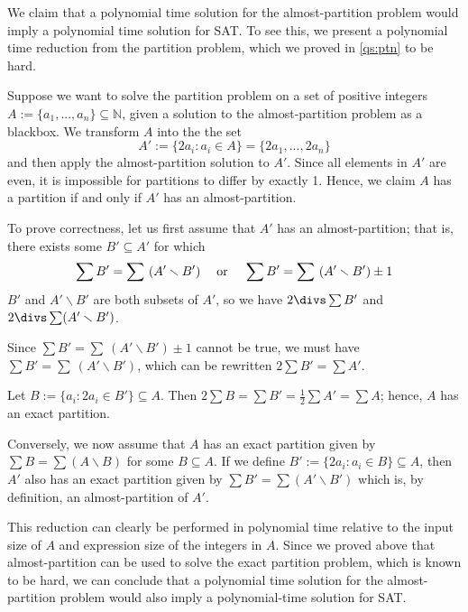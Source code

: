 \documentclass{article}
\begin{document}
\begin{solution}
We claim that a polynomial time solution for the almost-partition problem would imply a polynomial time solution for SAT. To see this, we present a polynomial time reduction from the partition problem, which we proved in \ref{qs:ptn} to be hard.

Suppose we want to solve the partition problem on a set of positive integers \( A := \{ a_1, ..., a_n\} \subseteq \mathbb{N} \), given a solution to the almost-partition problem as a blackbox. We transform \( A \) into the the set
\[ A' := \{ 2a_i : a_i \in A\} = \{ 2a_1, ..., 2a_n\} \]
and then apply the almost-partition solution to \( A' \). Since all elements in \( A' \) are even, it is impossible for partitions to differ by exactly 1. Hence, we claim  \( A \) has a partition if and only if \( A' \) has an almost-partition.


\vspace{1.5cc}
\begin{subproof} [Correctness]
To prove correctness, let us first assume that \( A' \) has an almost-partition; that is, there exists some \( B' \subseteq A' \) for which
\[\sum B' = \sum \ (A' \smallsetminus B') \hspace{1cc} \text{or} \hspace{1cc} \sum B' = \sum \ (A' \smallsetminus B') \pm 1\]
 \( B' \) and \( A' \smallsetminus B' \) are both subsets of \( A' \), so we have \( 2 \divs \sum B' \) and \( 2 \divs \sum (A' \smallsetminus B') \).

 Since \( \sum B' = \sum \ (A' \smallsetminus B') \pm 1 \) cannot be true, we must have \( \sum B' = \sum \ (A' \smallsetminus B') \), which can be rewritten \( 2 \sum B' = \sum A' \).

Let \( B := \{a_i : 2a_i \in B'\} \subseteq A \). Then \( 2 \sum B = \sum B' = \frac{1}{2} \sum A' = \sum A \); hence, \( A \) has an exact partition.

\vspace{1cc}
Conversely, we now assume that \( A \) has an exact partition given by \( \sum B = \sum (A \smallsetminus B) \) for some \( B \subseteq A \). If we define \( B' := \{2a_i : a_i \in B\} \subseteq A \), then \( A' \) also has an exact partition given by \( \sum B' = \sum (A' \smallsetminus B') \) which is, by definition, an almost-partition of \( A' \).
\end{subproof}


This reduction can clearly be performed in polynomial time relative to the input size of \( A \) and expression size of the integers in \( A \). Since we proved above that almost-partition can be used to solve the exact partition problem, which is known to be hard, we can conclude that a polynomial time solution for the almost-partition problem would also imply a polynomial-time solution for SAT.
\end{solution}
\pagebreak
\end{document}
